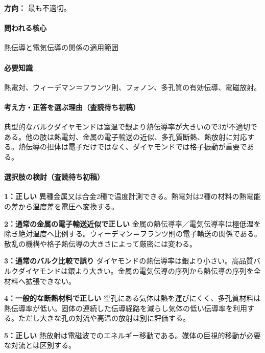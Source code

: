 \noindent\textbf{方向：} 最も不適切。\par

\paragraph{問われる核心} 熱伝導と電気伝導の関係の適用範囲

\paragraph{必要知識} 熱電対、ウィーデマン＝フランツ則、フォノン、多孔質の有効伝導、電磁放射。

\paragraph{考え方・正答を選ぶ理由（査読待ち初稿）} 典型的なバルクダイヤモンドは室温で銀より熱伝導率が大きいので3が不適切である。他の肢は熱電対、金属の電子輸送の近似、多孔質断熱、熱放射に対応する。熱伝導の担体は電子だけではなく、ダイヤモンドでは格子振動が重要である。

\paragraph{選択肢の検討（査読待ち初稿）}\mbox{}\par

\noindent\textbf{1：正しい} 異種金属又は合金2種で温度計測できる。熱電対は2種の材料の熱電能の差から温度差を電圧へ変換する。\par

\noindent\textbf{2：通常の金属の電子輸送近似で正しい} 金属の熱伝導率／電気伝導率は極低温を除き絶対温度へ比例する。ウィーデマン＝フランツ則の電子輸送の関係である。散乱の機構や格子熱伝導の大きさによって厳密には変わる。\par

\noindent\textbf{3：通常のバルク比較で誤り} ダイヤモンドの熱伝導率は銀より小さい。高品質バルクダイヤモンドは銀より大きい。金属の電気伝導の序列から熱伝導の序列を全材料へ拡張できない。\par

\noindent\textbf{4：一般的な断熱材料で正しい} 空孔にある気体は熱を運びにくく、多孔質材料は熱伝導率が低い。固体の連続した伝導経路を減らし気体の低い伝導率を利用する。ただし大きな孔の対流や高温の放射は別に評価する。\par

\noindent\textbf{5：正しい} 熱放射は電磁波でのエネルギー移動である。媒体の巨視的移動が必要な対流とは区別する。\par

